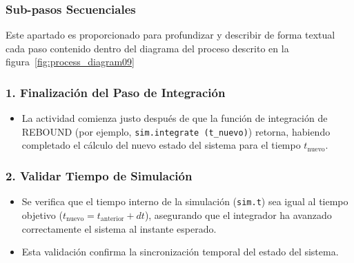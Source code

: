 \subsubsection{Sub-pasos Secuenciales}
Este apartado es proporcionado para profundizar y describir de forma textual cada paso contenido dentro del diagrama del proceso descrito en la figura~\ref{fig:process_diagram09}
\subsubsection*{1. Finalización del Paso de Integración}
\begin{itemize}
    \item La actividad comienza justo después de que la función de integración de REBOUND (por ejemplo, \texttt{sim.integrate~(t\_nuevo)}) retorna, habiendo completado el cálculo del nuevo estado del sistema para el tiempo $t_{\text{nuevo}}$.
\end{itemize}

\subsubsection*{2. Validar Tiempo de Simulación}
\begin{itemize}
    \item Se verifica que el tiempo interno de la simulación (\texttt{sim.t}) sea igual al tiempo objetivo ($t_{\text{nuevo}} = t_{\text{anterior}} + dt$), asegurando que el integrador ha avanzado correctamente el sistema al instante esperado.
    \item Esta validación confirma la sincronización temporal del estado del sistema.
\end{itemize}

